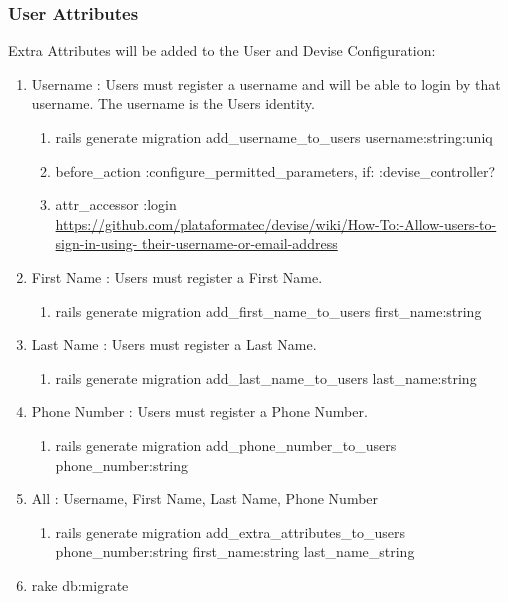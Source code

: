 \documentclass[11pt]{article}
\begin{document}
\subsubsection{User Attributes}
Extra Attributes will be added to the User and Devise Configuration:
\begin{enumerate}

	\item Username : Users must register a username and will be able to login by that username. The 	username is the Users identity.
		\begin{enumerate}
			\item rails generate migration add\_username\_to\_users username:string:uniq
			\item before\_action :configure\_permitted\_parameters, if: :devise\_controller?
			\item attr\_accessor :login
			\hfill \\
			{\url{https://github.com/plataformatec/devise/wiki/How-To:-Allow-users-to-sign-in-using-		their-username-or-email-address}}
		\end{enumerate}

	\item First Name : Users must register a First Name.
		\begin{enumerate}
			\item rails generate migration add\_first\_name\_to\_users first\_name:string
		\end{enumerate}

	\item Last Name : Users must register a Last Name.
		\begin{enumerate}
			\item rails generate migration add\_last\_name\_to\_users last\_name:string
		\end{enumerate}

	\item Phone Number : Users must register a Phone Number.
		\begin{enumerate}
			\item rails generate migration add\_phone\_number\_to\_users phone\_number:string
		\end{enumerate}

		\item All : Username, First Name, Last Name, Phone Number
			\begin{enumerate}
				\item rails generate migration add\_extra\_attributes\_to\_users phone\_number:string first\_name:string last\_name\_string
			\end{enumerate}

	\item rake db:migrate
\end{enumerate}
\end{document}
